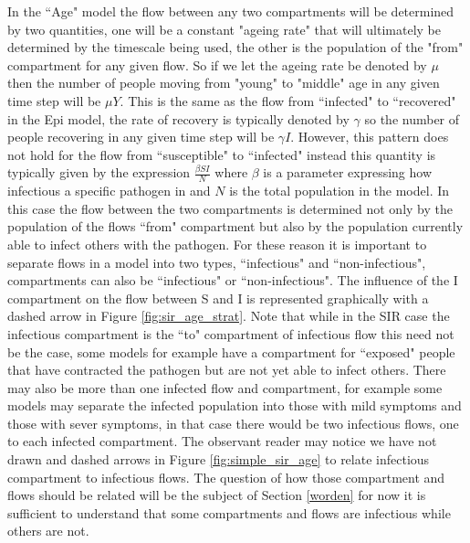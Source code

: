 In the ``Age" model the flow between any two compartments will be determined by two quantities, one will be a constant "ageing rate" that will ultimately be determined by the timescale being used, the other is the population of the "from" compartment for any given flow. So if we let the ageing rate be denoted by $\mu$ then the number of people moving from "young" to "middle" age in any given time step will be $\mu Y$. This is the same as the flow from ``infected" to ``recovered" in the Epi model, the rate of recovery is typically denoted by $\gamma$ so the number of people recovering in any given time step will be $\gamma I$. However, this pattern does not hold for the flow from ``susceptible" to ``infected" instead this quantity  is typically given by the expression $\frac{\beta S I}{N}$ where $\beta$ is a parameter expressing how infectious a specific pathogen in and $N$ is the total population in the model. In this case the flow between the two compartments is determined not only by the population of the flows ``from" compartment but also by the population currently able to infect others with the pathogen. For these reason it is important to separate flows in a model into two types, ``infectious" and ``non-infectious", compartments can also be ``infectious" or ``non-infectious". The influence of the I compartment on the flow between S and I is represented graphically with a dashed arrow in Figure \ref{fig:sir_age_strat}. Note that while in the SIR case the infectious compartment is the ``to" compartment of infectious flow this need not be the case, some models for example have a compartment for ``exposed" people that have contracted the pathogen but are not yet able to infect others. There may also be more than one infected flow and compartment, for example some models may separate the infected population into those with mild symptoms and those with sever symptoms, in that case there would be two infectious flows, one to each infected compartment. The observant reader may notice we have not drawn and dashed arrows in Figure \ref{fig:simple_sir_age} to relate infectious compartment to infectious flows. The question of how those compartment and flows should be related will be the subject of Section \ref{worden} for now it is sufficient to understand that some compartments and flows are infectious while others are not.

